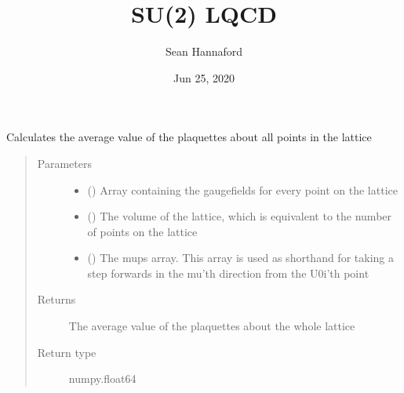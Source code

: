 \documentclass[letterpaper,10pt,english]{sphinxmanual}
\title{SU(2) LQCD}
\date{Jun 25, 2020}
\author{Sean Hannaford}
\begin{document}
\pagestyle{empty}
\sphinxmaketitle
\pagestyle{plain}
\sphinxtableofcontents
\pagestyle{normal}
\label{\detokenize{index::doc}}


\begin{fulllineitems}
\label{\detokenize{index:su2.calcPlaq}}
Calculates the average value of the plaquettes about all points
in the lattice
\begin{quote}\begin{description}
\item[{Parameters}] \leavevmode\begin{itemize}
\item {} 
 () \textendash{} Array containing the gaugefields for every point on the lattice

\item {} 
 () \textendash{} The volume of the lattice, which is equivalent to the number of
points on the lattice

\item {} 
 () \textendash{} The mups array. This array is used as shorthand for taking a
step forwards in the mu’th direction from the U0i’th point

\end{itemize}

\item[{Returns}] \leavevmode
The average value of the plaquettes about the whole lattice

\item[{Return type}] \leavevmode
numpy.float64

\end{description}\end{quote}

\end{fulllineitems}

\end{document}
